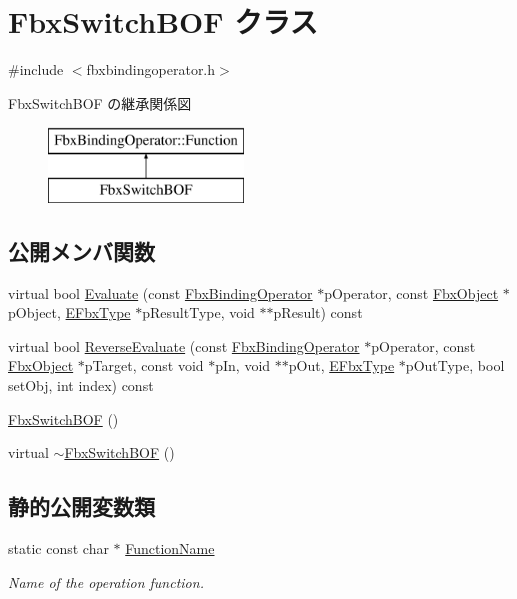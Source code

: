 \hypertarget{class_fbx_switch_b_o_f}{}\section{Fbx\+Switch\+B\+OF クラス}
\label{class_fbx_switch_b_o_f}


{\ttfamily \#include $<$fbxbindingoperator.\+h$>$}

Fbx\+Switch\+B\+OF の継承関係図\begin{figure}[H]
\begin{center}
\leavevmode
\includegraphics[height=2.000000cm]{class_fbx_switch_b_o_f}
\end{center}
\end{figure}
\subsection*{公開メンバ関数}
\begin{DoxyCompactItemize}
\item 
virtual bool \hyperlink{class_fbx_switch_b_o_f_aa6cb2b6d6b4b03849efc885c86152e2e}{Evaluate} (const \hyperlink{class_fbx_binding_operator}{Fbx\+Binding\+Operator} $\ast$p\+Operator, const \hyperlink{class_fbx_object}{Fbx\+Object} $\ast$p\+Object, \hyperlink{fbxpropertytypes_8h_a73913a5ddfb20e57c6f25e9e6784bd92}{E\+Fbx\+Type} $\ast$p\+Result\+Type, void $\ast$$\ast$p\+Result) const
\item 
virtual bool \hyperlink{class_fbx_switch_b_o_f_af48ca495a335e415853ec0c5269867a6}{Reverse\+Evaluate} (const \hyperlink{class_fbx_binding_operator}{Fbx\+Binding\+Operator} $\ast$p\+Operator, const \hyperlink{class_fbx_object}{Fbx\+Object} $\ast$p\+Target, const void $\ast$p\+In, void $\ast$$\ast$p\+Out, \hyperlink{fbxpropertytypes_8h_a73913a5ddfb20e57c6f25e9e6784bd92}{E\+Fbx\+Type} $\ast$p\+Out\+Type, bool set\+Obj, int index) const
\item 
\hyperlink{class_fbx_switch_b_o_f_a1f71ba02ab3cb9e5b9aad176406b87d5}{Fbx\+Switch\+B\+OF} ()
\item 
virtual \hyperlink{class_fbx_switch_b_o_f_ae3abd0bfde3d20c9f34b9705a1ab0f53}{$\sim$\+Fbx\+Switch\+B\+OF} ()
\end{DoxyCompactItemize}
\subsection*{静的公開変数類}
\begin{DoxyCompactItemize}
\item 
static const char $\ast$ \hyperlink{class_fbx_switch_b_o_f_a5d39c1526096c35b43cb93759270df40}{Function\+Name}
\begin{DoxyCompactList}\small\item\em Name of the operation function. \end{DoxyCompactList}\end{DoxyCompactItemize}


